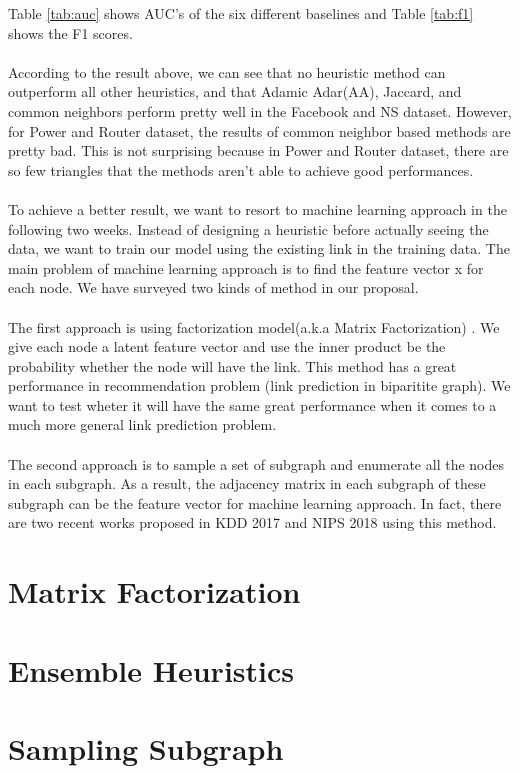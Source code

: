 \documentclass[12pt]{article}
\begin{document}
	Table \ref{tab:auc} shows AUC's of the six different baselines and Table \ref{tab:f1} shows the F1 scores.
	\\
	\\
	According to the result above, we can see that no heuristic method can outperform all other heuristics, and that Adamic Adar(AA), Jaccard, and common neighbors perform pretty well in the Facebook and NS dataset. However, for Power and Router dataset, the results of common neighbor based methods are pretty bad. This is not surprising because in Power and Router dataset, there are so few triangles that the methods aren't able to achieve good performances. 
	\\
	\\
	To achieve a better result, we want to resort to machine learning approach in the following two weeks. Instead of designing a heuristic before actually seeing the data, we want to train our model using the existing link in the training data. The main problem of machine learning approach is to find the feature vector x for each node. We have surveyed two kinds of method in our proposal. 
	\\
	\\
	The first approach is using factorization model(a.k.a Matrix Factorization) \cite{mf}. We give each node a latent feature vector and use the inner product be the probability whether the node will have the link. This method has a great performance in recommendation problem (link prediction in biparitite graph). We want to test wheter it will have the same great performance when it comes to a much more general link prediction problem. 
	\\
	\\
	The second approach is to sample a set of subgraph and enumerate all the nodes in each subgraph. As a result, the adjacency matrix in each subgraph of these subgraph can be the feature vector for machine learning approach. In fact, there are two recent works proposed in KDD 2017 \cite{lp2017} and NIPS 2018 \cite{lp2018} using this method. 
	
	\section{Matrix Factorization}

	\section{Ensemble Heuristics}
	
	\section{Sampling Subgraph}
	
	
	
	
	
\end{document}
